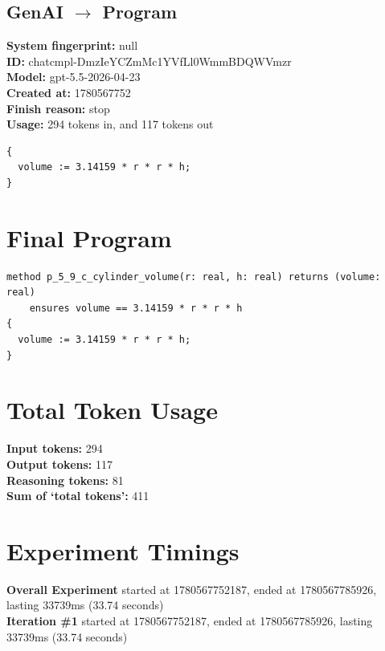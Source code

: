 \documentclass{article}
\begin{document}
\subsection*{GenAI $\rightarrow$ Program}
\textbf{System fingerprint: }null
\\\textbf{ID: }chatcmpl-DmzIeYCZmMc1YVfLl0WmmBDQWVmzr
\\\textbf{Model: }gpt-5.5-2026-04-23
\\\textbf{Created at: }1780567752
\\\textbf{Finish reason: }stop
\\\textbf{Usage: }294 tokens in, and 117 tokens out
\begin{lstlisting}
{
  volume := 3.14159 * r * r * h;
}
\end{lstlisting}
\section*{Final Program}
\begin{lstlisting}
method p_5_9_c_cylinder_volume(r: real, h: real) returns (volume: real)
	ensures volume == 3.14159 * r * r * h
{
  volume := 3.14159 * r * r * h;
}
\end{lstlisting}
\section*{Total Token Usage}
\textbf{Input tokens: }294
\\\textbf{Output tokens: }117
\\\textbf{Reasoning tokens: }81
\\\textbf{Sum of `total tokens': }411
\section*{Experiment Timings}
\textbf{Overall Experiment} started at 1780567752187, ended at 1780567785926, lasting 33739ms (33.74 seconds)
\\\textbf{Iteration \#1} started at 1780567752187, ended at 1780567785926, lasting 33739ms (33.74 seconds)
\end{document}
